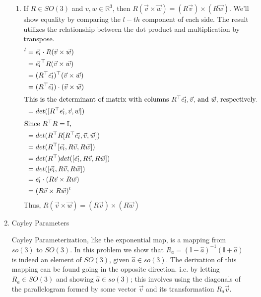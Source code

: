 \documentclass[12pt]{article}
\newcommand{\R}{\mathbb{R}}
\newcommand{\I}{\mathbb{I}}
\begin{document}
\begin{enumerate}
\begin{enumerate}
                \item If $R \in SO(3)$ and $v,w \in \R^3$, then $R(\vec{v} \times \vec{w} )=( R \vec{v}) \times (R \vec{w})$. We'll show equality by comparing the $l-th$ component of each side. The result utilizes the relationship between the dot product and multiplication by transpose.
                \begin{align}
                    [R(\vec{v} \times \vec{w} )]^l &= \vec{e_l} \cdot R(\vec{v} \times \vec{w} ) \\
                                            &= \vec{e_l} ^\top R(\vec{v} \times \vec{w} ) \\
                                            &= (R^\top \vec{e_l})^{\top} (\vec{v} \times \vec{w} ) \\
                                            &= (R^\top \vec{e_l}) \cdot (\vec{v} \times \vec{w}) \label{comment_1}\\
                                            \intertext{This is the determinant of matrix with columns $R^\top \vec{e_l}, \vec{v},$ and $\vec{w}$, respectively. } 
                                            &= det([R^\top \vec{e_l} , \vec{v} ,\vec{w}]) \\
                                            \intertext{Since $R^\top R = \I$,} 
                                            &= det(R^\top R [R^\top \vec{e_l} , \vec{v} , \vec{w}]) \\
                                            &= det(R^\top [\vec{e_l} , R \vec{v} , R \vec{w}]) \\
                                            &= det(R^\top) det([\vec{e_l} , R \vec{v} , R \vec{w}])\\
                                            &= det([\vec{e_l} , R \vec{v} , R \vec{w}])\\
                                            &= \vec{e_l} \cdot (R \vec{v} \times R \vec{w}) \\
                                            &= (R \vec{v} \times R \vec{w})^l
                \end{align}
                Thus, $R(\vec{v} \times \vec{w} )=( R \vec{v}) \times (R \vec{w})$
            \end{enumerate}
        \item Cayley Parameters
        
            Cayley Parameterization, like the exponential map, is a mapping from $so(3)$ to $SO(3)$. In this problem we show that $R_a = (\I - \widehat{a})^{-1}(\I + \widehat{a})$ is indeed an element of $SO(3)$, given $\widehat{a} \in so(3)$. The derivation of this mapping can be found going in the opposite direction. i.e. by letting $R_a \in SO(3)$ and showing $\widehat{a} \in so(3)$; this involves using the diagonals of the parallelogram formed by some vector $\vec{v}$ and its transformation $R_a{\vec{v}}$.
            

\end{enumerate}
\end{document}
